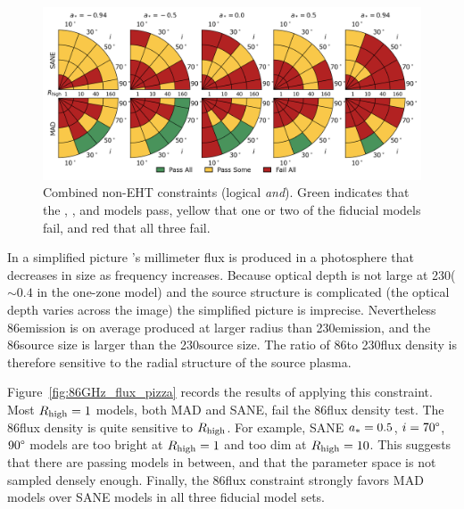 \begin{figure}
  \centering
  \includegraphics[width=\textwidth]{./figures/Non_Interferometric_Constraints.png}
  \caption{Combined non-EHT constraints (logical {\em and}).
    Green indicates that the \kharma, \bhac, and \hamr models pass, yellow that one or two of the fiducial models fail, and red that all three fail.}
  \label{fig:non_eht_cuts}
\end{figure}


In a simplified picture \sgra's millimeter flux is produced in a photosphere that decreases in size as frequency increases.
Because optical depth is not large at 230\GHz ($\sim 0.4$ in the one-zone model) and the source structure is complicated (the optical depth varies across the image) the simplified picture is imprecise.
Nevertheless 86\GHz emission is on average produced at larger radius than 230\GHz emission, and the 86\GHz source size is larger than the 230\GHz source size.  The ratio of 86\GHz to 230\GHz flux density is therefore sensitive to the radial structure of the source plasma.

Figure~\ref{fig:86GHz_flux_pizza} records the results of applying this constraint.
Most $R_\mathrm{high} = 1$ models, both MAD and SANE, fail the 86\GHz flux density test.
The 86\GHz flux density is quite sensitive to $R_\mathrm{high}$.
For example, SANE $a_* = 0.5$, $i = 70\degree$, $90\degree$ models are too bright at $R_\mathrm{high} = 1$ and too dim at $R_\mathrm{high} = 10$.  This suggests that there are passing models in between, and that the parameter space is not sampled densely enough.
Finally, the 86\GHz flux constraint strongly favors MAD models over SANE models in all three fiducial model sets.


